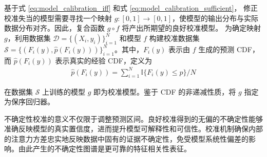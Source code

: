 基于式 \eqref{eq:model_calibration_iff} 和式 \eqref{eq:model_calibration_sufficient}，
修正校准失当的模型需要寻找一个映射 $g: [0,1] \rightarrow [0,1]$，使模型的输出分布与实际数据分布对齐。因此，复合函数 $g \circ f$ 将产出所期望的良好校准模型。
% 
为确定映射 $g$，利用数据集 $\mathcal{D}=\{(X_i,y_i)\}_{i=1}^{N}$ 和模型 $f$ 构建校准数据集 $\mathcal{S}=\{(F_i(y), \hat{p}(F_i(y)))\}_{i=1}^{N}$。其中，$F_i(y)$ 表示由 $f$ 生成的预测 CDF，而 $\hat{p}(F_i(y))$ 表示真实的经验 CDF，定义为
% 
\begin{equation}
\begin{aligned}
\hat{p}(F_{i}(y)) = \sum\nolimits_{i=1}^{N}\mathbb{I}\{F_{i}(y)\leq p\}/N
\end{aligned}
\label{eq:true_empirical_cdf}
\end{equation}%

在数据集 $\mathcal{S}$ 上训练的模型 $g$ 即为校准模型。鉴于 CDF 的非递减性质，将 $g$ 指定为保序回归器。

不确定性校准的意义不仅限于调整预测区间。良好校准得到的无偏的不确定性能够准确反映模型的真实置信度，进而提升模型可解释性和可信性。校准机制确保内部的注意力方差忠实地反映数据中固有的证据不确定性，免受模型系统性偏差的影响。由此产生的不确定性图谱是更可靠的特征相关性表征。

        
